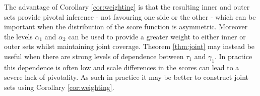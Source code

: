 \begin{remark}
	The advantage of Corollary \ref{cor:weighting} is that the resulting inner and outer sets provide pivotal inference - not favouring one side or the other - which can be important when the distribution of the score function is asymmetric. Moreover the levels $\alpha_1$ and $\alpha_2$ can be used to provide a greater weight to either inner or outer sets whilst maintaining joint coverage. Theorem \ref{thm:joint} may instead be useful when there are strong levels of dependence between $\tau_1$ and $\gamma_1$. In practice this dependence is often low and scale differences in the scores can lead to a severe lack of pivotality. As such in practice it may be better to construct joint sets using Corollary \ref{cor:weighting}. 
\end{remark}

